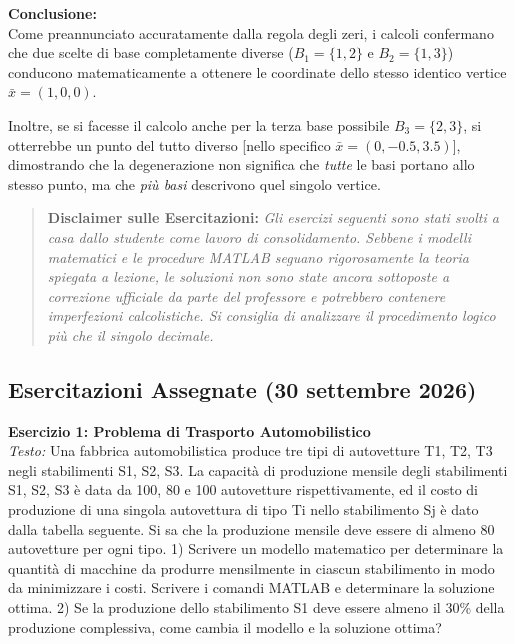 \documentclass[12pt, a4paper]{article}
\begin{document}
	\vspace{0.4cm}
	\textbf{Conclusione:}\\
	Come preannunciato accuratamente dalla regola degli zeri, i calcoli confermano che due scelte di base completamente diverse ($B_1=\{1,2\}$ e $B_2=\{1,3\}$) conducono matematicamente a ottenere le coordinate dello stesso identico vertice $\bar{x} = (1, 0, 0)$. 
	
	Inoltre, se si facesse il calcolo anche per la terza base possibile $B_3=\{2,3\}$, si otterrebbe un punto del tutto diverso [nello specifico $\bar{x} = (0, -0.5, 3.5)$], dimostrando che la degenerazione non significa che \textit{tutte} le basi portano allo stesso punto, ma che \textit{più basi} descrivono quel singolo vertice.
	
	\vspace{0.8cm}
	\begin{quote}
		\textbf{Disclaimer sulle Esercitazioni:} \textit{Gli esercizi seguenti sono stati svolti a casa dallo studente come lavoro di consolidamento. Sebbene i modelli matematici e le procedure MATLAB seguano rigorosamente la teoria spiegata a lezione, le soluzioni non sono state ancora sottoposte a correzione ufficiale da parte del professore e potrebbero contenere imperfezioni calcolistiche. Si consiglia di analizzare il procedimento logico più che il singolo decimale.}
	\end{quote}
	\vspace{0.4cm}
	
	\subsection*{Esercitazioni Assegnate (30 settembre 2026)}
	
	\textbf{Esercizio 1: Problema di Trasporto Automobilistico}\\
	\textit{Testo:} Una fabbrica automobilistica produce tre tipi di autovetture T1, T2, T3 negli stabilimenti S1, S2, S3. La capacità di produzione mensile degli stabilimenti S1, S2, S3 è data da 100, 80 e 100 autovetture rispettivamente, ed il costo di produzione di una singola autovettura di tipo Ti nello stabilimento Sj è dato dalla tabella seguente. Si sa che la produzione mensile deve essere di almeno 80 autovetture per ogni tipo. 
	1) Scrivere un modello matematico per determinare la quantità di macchine da produrre mensilmente in ciascun stabilimento in modo da minimizzare i costi. Scrivere i comandi MATLAB e determinare la soluzione ottima.
	2) Se la produzione dello stabilimento S1 deve essere almeno il 30\% della produzione complessiva, come cambia il modello e la soluzione ottima?
	
\end{document}
